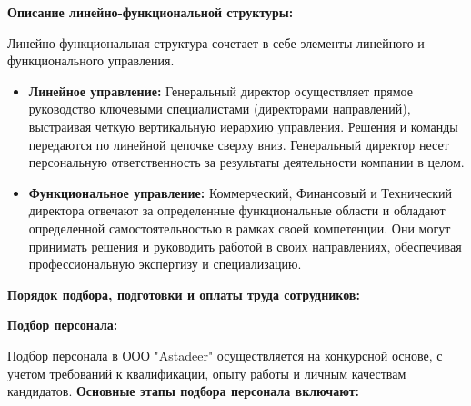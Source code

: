     \vspace{0.3cm}

    \textbf{Описание линейно-функциональной структуры:}

    Линейно-функциональная структура сочетает в себе элементы линейного и функционального управления.

    \begin{itemize}
        \item \textbf{Линейное управление:}  Генеральный директор осуществляет прямое руководство ключевыми специалистами (директорами направлений), выстраивая четкую вертикальную иерархию управления.  Решения и команды передаются по линейной цепочке сверху вниз.  Генеральный директор несет персональную ответственность за результаты деятельности компании в целом.
        \item \textbf{Функциональное управление:}  Коммерческий, Финансовый и Технический директора отвечают за определенные функциональные области и обладают определенной самостоятельностью в рамках своей компетенции.  Они могут принимать решения и руководить работой в своих направлениях, обеспечивая профессиональную экспертизу и специализацию.
    \end{itemize}

    \vspace{0.3cm}

    \textbf{Порядок подбора, подготовки и оплаты труда сотрудников:}

    \textbf{Подбор персонала:}

    Подбор персонала в ООО "Astadeer" осуществляется на конкурсной основе, с учетом требований к квалификации, опыту работы и личным качествам кандидатов.  \textbf{Основные этапы подбора персонала включают:}

